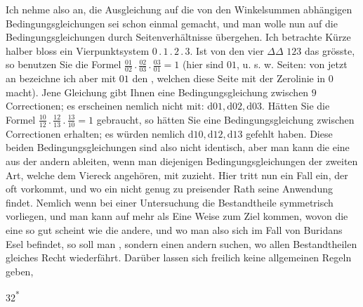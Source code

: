 Ich nehme also an, die Ausgleichung auf die von den Winkelsummen abhängigen Bedingungsgleichungen sei schon einmal gemacht, und man wolle nun auf die Bedingungsgleichungen durch Seitenverhältnisse übergehen. Ich betrachte Kürze halber bloss ein Vierpunktsystem \(0\,.\,1\,.\,2\,.\,3\). Ist von den vier \(\Delta\Delta\) \(123\) das grösste, so benutzen Sie die Formel \(\frac{01}{02}\,.\,\frac{02}{03}\,.\,\frac{03}{01}=1\) (hier sind \(01\), u. s. w. Seiten: von jetzt an bezeichne ich aber mit \(01\) den , welchen diese Seite mit der Zerolinie in \(0\) macht). Jene Gleichung gibt Ihnen  eine Bedingungsgleichung zwischen \(9\) Correctionen; es erscheinen nemlich nicht mit: \(\mathrm{d}01,\mathrm{d}02,\mathrm{d}03\). Hätten Sie die Formel \(\frac{10}{12}\,.\,\frac{12}{13}\,.\,\frac{13}{10}=1\) gebraucht, so hätten Sie eine Bedingungsgleichung zwischen  Correctionen erhalten; es würden nemlich \(\mathrm{d}10,\mathrm{d}12,\mathrm{d}13\) gefehlt haben. Diese beiden Bedingungsgleichungen sind also nicht identisch, aber man kann die eine aus der andern ableiten, wenn man diejenigen Bedingungsgleichungen der zweiten Art, welche dem Viereck angehören, mit zuzieht. Hier tritt nun ein Fall ein, der oft vorkommt, und wo ein nicht genug zu preisender Rath seine Anwendung findet. Nemlich wenn bei einer Untersuchung die Bestandtheile symmetrisch vorliegen, und man kann auf mehr als Eine Weise zum Ziel kommen, wovon die eine so gut scheint wie die andere, und wo man also sich im Fall von Buridans Esel befindet, so soll man , sondern einen andern suchen, wo allen Bestandtheilen gleiches Recht wiederfährt. Darüber lassen sich freilich keine allgemeinen Regeln geben,
\par\smallskip
\noindent\hfill{\small 32\textsuperscript{*}}\hspace*{.12\linewidth}\par
